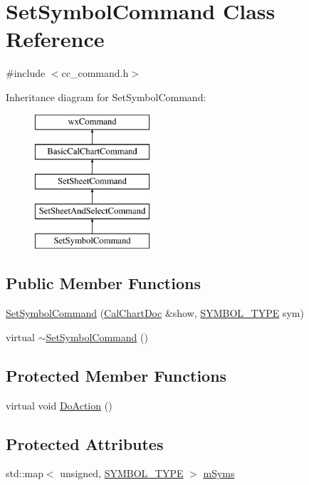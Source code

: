 \hypertarget{a00137}{\section{Set\-Symbol\-Command Class Reference}
\label{a00137}
}


{\ttfamily \#include $<$cc\-\_\-command.\-h$>$}

Inheritance diagram for Set\-Symbol\-Command\-:\begin{figure}[H]
\begin{center}
\leavevmode
\includegraphics[height=5.000000cm]{a00137}
\end{center}
\end{figure}
\subsection*{Public Member Functions}
\begin{DoxyCompactItemize}
\item 
\hyperlink{a00137_af1dd5c2e86c9aa37eda56dcfb4078e13}{Set\-Symbol\-Command} (\hyperlink{a00020}{Cal\-Chart\-Doc} \&show, \hyperlink{a00216_a68cd84e0300be6f9ff4474682762c9ee}{S\-Y\-M\-B\-O\-L\-\_\-\-T\-Y\-P\-E} sym)
\item 
virtual \hyperlink{a00137_a59ad7caaa3c87cc87b1d58a2060d5872}{$\sim$\-Set\-Symbol\-Command} ()
\end{DoxyCompactItemize}
\subsection*{Protected Member Functions}
\begin{DoxyCompactItemize}
\item 
virtual void \hyperlink{a00137_ac01aa3b3a02f3a8db5b16e9cbb1c3228}{Do\-Action} ()
\end{DoxyCompactItemize}
\subsection*{Protected Attributes}
\begin{DoxyCompactItemize}
\item 
std\-::map$<$ unsigned, \hyperlink{a00216_a68cd84e0300be6f9ff4474682762c9ee}{S\-Y\-M\-B\-O\-L\-\_\-\-T\-Y\-P\-E} $>$ \hyperlink{a00137_a7e3ba2cc3c4894e6189a075c1147348f}{m\-Syms}
\end{DoxyCompactItemize}


